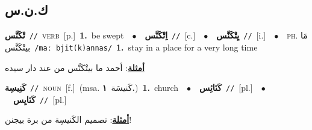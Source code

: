 \documentclass[10pt,a4paper,twoside]{article} %
\begin{document}
\begin{multicols}{2}
\vspace{-3mm}
\subsection*{\color{blue}\foreignlanguage{arabic}{ك.ن.س}\color{blue}{}} 

{\setlength\topsep{0pt}\textbf{\foreignlanguage{arabic}{تْكَنَّس}}\ {\color{gray}\texttt{//}\color{black}}\ \textsc{verb}\ [p.]\ \textbf{1.}~be swept\ \ $\bullet$\ \ \setlength\topsep{0pt}\textbf{\foreignlanguage{arabic}{اِتْكَنَّس}}\ {\color{gray}\texttt{//}\color{black}}\ [c.]\ \ $\bullet$\ \ \setlength\topsep{0pt}\textbf{\foreignlanguage{arabic}{يِتْكَنَّس}}\ {\color{gray}\texttt{//}\color{black}}\ [i.]\ \ $\bullet$\ \ \textsc{ph.} \color{gray} \foreignlanguage{arabic}{مَا بيتْكَنَّس}\color{black}\ {\color{gray}\texttt{/{\sffamily maː bjit(k)annas}/}\color{black}}\ \textbf{1.}~stay in a place for a very long time\  \begin{flushright}\color{gray}\foreignlanguage{arabic}{\textbf{\underline{\foreignlanguage{arabic}{أمثلة}}}: أحمد ما بيتْكَنَّس من عند دار سيده}\end{flushright}\color{black}} \vspace{2mm}

{\setlength\topsep{0pt}\textbf{\foreignlanguage{arabic}{كَنِيسِة}}\ {\color{gray}\texttt{//}\color{black}}\ \textsc{noun}\ [f.]\ \color{gray}(msa. \foreignlanguage{arabic}{كَنيسَة}~\foreignlanguage{arabic}{\textbf{١.}})\color{black}\ \textbf{1.}~church\ \ $\bullet$\ \ \setlength\topsep{0pt}\textbf{\foreignlanguage{arabic}{كَنَائِس}}\ {\color{gray}\texttt{//}\color{black}}\ [pl.]\ \ $\bullet$\ \ \setlength\topsep{0pt}\textbf{\foreignlanguage{arabic}{كَنَايِس}}\ {\color{gray}\texttt{//}\color{black}}\ [pl.]\  \begin{flushright}\color{gray}\foreignlanguage{arabic}{\textbf{\underline{\foreignlanguage{arabic}{أمثلة}}}: تصميم الكَنيسِة من برة بيجنن!}\end{flushright}\color{black}} \vspace{2mm}


\end{multicols}
\end{document}
